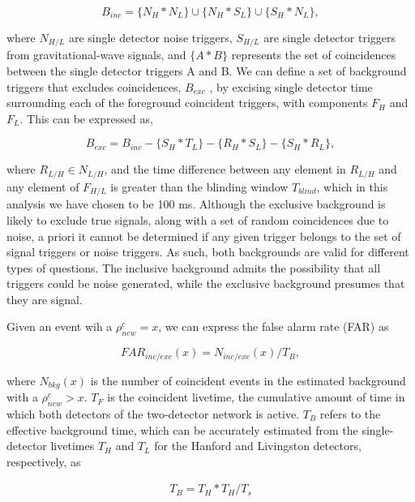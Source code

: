 \begin{equation}
B_{inc} = \{N_H * N_L\} \cup \{ N_H * S_L \} \cup \{S_H * N_L\},
\end{equation}

where $N_{H/L}$ are single detector noise triggers, $S_{H/L}$ are single detector triggers from gravitational-wave signals, and $\{A * B\}$ represents the set of coincidences between the single detector triggers A and B. We can define a set of background triggers that excludes coincidences, $B_{exc}$ , by excising single detector time surrounding each of the foreground coincident triggers, with components $F_H$ and $F_L$. This can be expressed as,

\begin{equation}
B_{exc} = B_{inc} - \{S_H * T_L\} - \{R_H * S_L\} - \{S_H * R_L\},
\end{equation}

where $R_{L/H} \in N_{L/H}$, and the time difference between any element in $R_{L/H}$ and any element of $F_{H/L}$ is greater than the blinding window $T_{blind}$, which in this analysis we have chosen to be 100 ms. Although the exclusive background is likely to exclude true signals, along with a set of random coincidences due to noise, a priori it cannot be determined if any given trigger belongs to the set of signal triggers or noise triggers. As such, both backgrounds are valid for different types of questions. The inclusive background admits the possibility that all triggers could be noise generated, while the exclusive background presumes that they are signal.

Given an event wih a $\rho^c_{new}=x$, we can express the false alarm rate (FAR) as

\begin{equation}
FAR_{inc/exc} (x) = N_{inc/exc} (x) / {T_B},
\end{equation}

where $N_{bkg}(x)$ is the number of coincident events in the estimated background with a $\rho^c_{new} > x$. $T_F$ is the coincident livetime, the cumulative amount of time in which both detectors of the two-detector network is active. $T_B$ refers to the effective background time, which can be accurately estimated from the single-detector livetimes $T_H$ and $T_L$ for the Hanford and Livingston detectors, respectively, as

\begin{eqnarray}
T_B =  T_H * T_H / T_s
\end{eqnarray}

